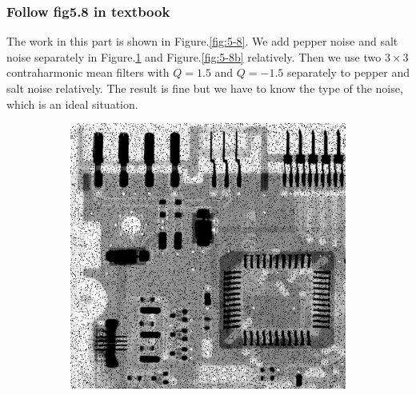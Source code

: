 \subsubsection{Follow fig5.8 in textbook}
The work in this part is shown in Figure.\ref{fig:5-8}. We add pepper noise and salt noise separately in Figure.\ref{fig:5-8a} and Figure.\ref{fig:5-8b} relatively. Then we use two $3\times 3$ contraharmonic mean filters with $Q=1.5$ and $Q=-1.5$ separately to pepper and salt noise relatively. The result is fine but we have to know the type of the noise, which is an ideal situation. 
\begin{figure}[h]
	\centering
	\begin{subfigure}[b]{0.4\linewidth}
		\includegraphics[width=\linewidth]{myfigure/p4/42-pepper.png}
		\caption{}
		\label{fig:5-8a}
	\end{subfigure}
	\begin{subfigure}[b]{0.4\linewidth}

\end{subfigure}
\end{figure}
